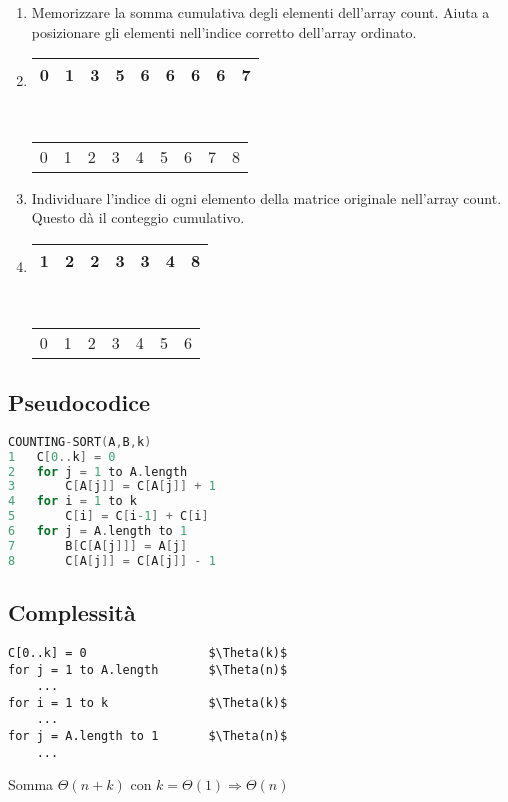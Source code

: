 \begin{enumerate}
    \item Memorizzare la somma cumulativa degli elementi dell'array count. Aiuta a posizionare gli elementi nell'indice corretto dell'array ordinato.
    \item[]
    \begin{tabular}{|c|c|c|c|c|c|c|c|c|}
        \hline
        0 & 1 & 3 & 5 & 6 & 6 & 6 & 6 & 7 \\ 
        \hline
    \end{tabular}
    \\
    \begin{tabular}{ccccccccc}
        0 & 1 & 2 & 3 & 4 & 5 & 6 & 7 & 8 \\ 
    \end{tabular}

    \item Individuare l'indice di ogni elemento della matrice originale nell'array count. Questo dà il conteggio cumulativo.
    \item[]
    \begin{tabular}{|c|c|c|c|c|c|c|}
        \hline
        1 & 2 & 2 & 3 & 3 & 4 & 8 \\ 
        \hline
    \end{tabular}
    \\
    \begin{tabular}{ccccccc}
        0 & 1 & 2 & 3 & 4 & 5 & 6 \\ 
    \end{tabular}
    
\end{enumerate}

\subsection{Pseudocodice}
\begin{mdframed}
\begin{lstlisting}[language=C]
COUNTING-SORT(A,B,k)
1   C[0..k] = 0
2   for j = 1 to A.length
3       C[A[j]] = C[A[j]] + 1
4   for i = 1 to k
5       C[i] = C[i-1] + C[i]
6   for j = A.length to 1
7       B[C[A[j]]] = A[j]
8       C[A[j]] = C[A[j]] - 1
\end{lstlisting}
\end{mdframed}

\subsection{Complessità}
\begin{lstlisting}[mathescape=true]
C[0..k] = 0                 $\Theta(k)$
for j = 1 to A.length       $\Theta(n)$
    ...
for i = 1 to k              $\Theta(k)$
    ...
for j = A.length to 1       $\Theta(n)$
    ...
\end{lstlisting}
Somma $\Theta(n+k)$ con $k=\Theta(1) \Rightarrow \Theta(n)$

\newpage